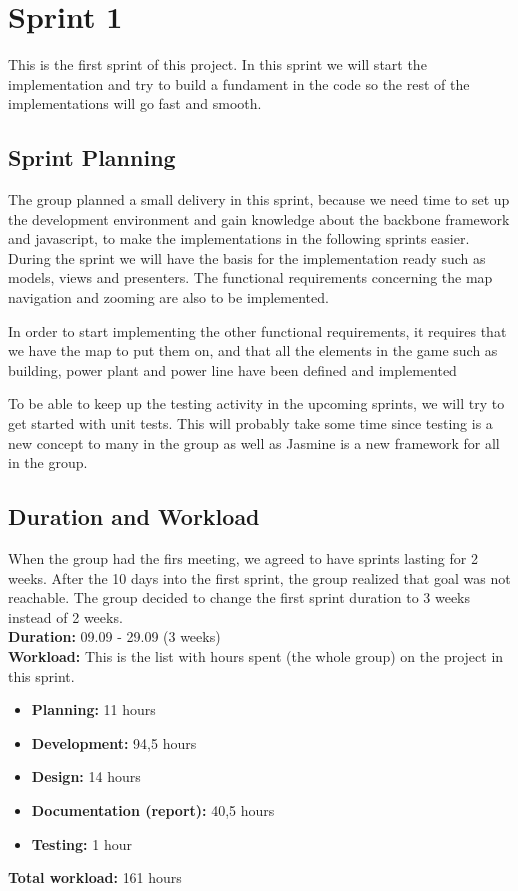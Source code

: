 \section{Sprint 1}
This is the first sprint of this project. In this sprint we will start the implementation
and try to build a fundament in the code so the rest of the implementations will go fast
and smooth. 


\subsection{Sprint Planning}
	The group planned a small delivery in this sprint, because we need time to set up the development environment and gain knowledge about the backbone framework and javascript, to make the implementations in the following sprints easier. During the sprint we will have the basis for the implementation ready such as models, views and presenters. The functional requirements concerning the map navigation and zooming are also to be implemented.

	In order to start implementing the other functional requirements, it requires that we have the map to put them on, and that all the elements in the game such as building, power plant and power line have been defined and implemented 

	To be able to keep up the testing activity in the upcoming sprints, we will try to get started with unit tests. This will probably take some time since testing is a new concept to many in the group as well as Jasmine is a new framework for all in the group. 

\subsection{Duration and Workload}
	When the group had the firs meeting, we agreed to have sprints lasting for 2 weeks.
	After the 10 days into the first sprint, the group realized that goal was not reachable.
	The group decided to change the first sprint duration to 3 weeks instead of 2 weeks. \\

	{\bf Duration:} 09.09 - 29.09 (3 weeks)\\
	{\bf Workload:} This is the list with hours spent (the whole group) on the project in this sprint.
	\begin{itemize}
		\item {\bf Planning:} 11 hours
		\item {\bf Development:} 94,5 hours
		\item {\bf Design:} 14 hours
		\item {\bf Documentation (report):} 40,5 hours
		\item {\bf Testing:} 1 hour
	\end{itemize}
	{\bf Total workload: } 161 hours \\
	
